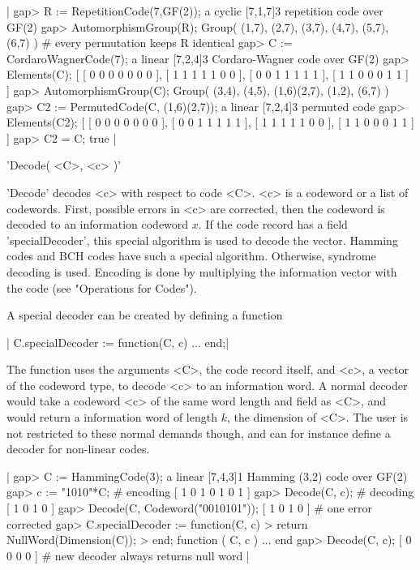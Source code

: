 |    gap> R := RepetitionCode(7,GF(2));
    a cyclic [7,1,7]3 repetition code over GF(2)
    gap> AutomorphismGroup(R);
    Group( (1,7), (2,7), (3,7), (4,7), (5,7), (6,7) )
                            # every permutation keeps R identical
    gap> C := CordaroWagnerCode(7);
    a linear [7,2,4]3 Cordaro-Wagner code over GF(2)
    gap> Elements(C);
    [ [ 0 0 0 0 0 0 0 ], [ 1 1 1 1 1 0 0 ], [ 0 0 1 1 1 1 1 ],
      [ 1 1 0 0 0 1 1 ] ]
    gap> AutomorphismGroup(C);
    Group( (3,4), (4,5), (1,6)(2,7), (1,2), (6,7) )
    gap> C2 :=  PermutedCode(C, (1,6)(2,7));
    a linear [7,2,4]3 permuted code
    gap> Elements(C2);
    [ [ 0 0 0 0 0 0 0 ], [ 0 0 1 1 1 1 1 ], [ 1 1 1 1 1 0 0 ],
      [ 1 1 0 0 0 1 1 ] ]
    gap> C2 = C;
    true |


'Decode( <C>, <c> )'

'Decode' decodes <c> with respect  to code <C>. <c>  is  a codeword or  a
list of codewords. First, possible errors  in <c> are corrected, then the
codeword is decoded to  an information codeword $x$.  If the code  record
has a  field 'specialDecoder', this special  algorithm  is used to decode
the vector.  Hamming  codes and BCH  codes have such a special algorithm.
Otherwise, syndrome decoding is used. Encoding is done by multiplying the
information vector with the code (see "Operations for Codes").

A special decoder can be created by defining a function

|    C.specialDecoder := function(C, c) ... end;|

The function uses  the arguments <C>, the code  record itself, and <c>, a
vector of  the  codeword type, to decode   <c> to an information word.  A
normal decoder  would take a codeword  <c>  of the  same  word length and
field as <C>, and  would  return a information  word  of length  $k$, the
dimension of   <C>. The user  is not  restricted  to these normal demands
though, and can for instance define a decoder for non-linear codes.

|    gap> C := HammingCode(3);
    a linear [7,4,3]1 Hamming (3,2) code over GF(2)
    gap> c := "1010"*C;                    # encoding
    [ 1 0 1 0 1 0 1 ]
    gap> Decode(C, c);                     # decoding
    [ 1 0 1 0 ]
    gap> Decode(C, Codeword("0010101"));
    [ 1 0 1 0 ]                            # one error corrected
    gap> C.specialDecoder := function(C, c)
    > return NullWord(Dimension(C));
    > end;
    function ( C, c ) ... end
    gap> Decode(C, c);
    [ 0 0 0 0 ]           # new decoder always returns null word |

